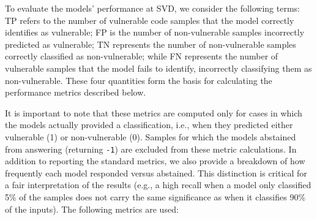 \documentclass[lettersize,journal]{IEEEtran}
\begin{document}
To evaluate the models' performance at \gls{SVD}, we consider the following terms: \gls{TP} refers to the number of vulnerable code samples that the model correctly identifies as vulnerable; \gls{FP} is the number of non-vulnerable samples incorrectly predicted as vulnerable; \gls{TN} represents the number of non-vulnerable samples correctly classified as non-vulnerable; while \gls{FN} represents the number of vulnerable samples that the model fails to identify, incorrectly classifying them as non-vulnerable. These four quantities form the basis for calculating the performance metrics described below.

It is important to note that these metrics are computed only for cases in which the models actually provided a classification, i.e., when they predicted either vulnerable (1) or non-vulnerable (0). Samples for which the models abstained from answering (returning \texttt{-1}) are excluded from these metric calculations. In addition to reporting the standard metrics, we also provide a breakdown of how frequently each model responded versus abstained. This distinction is critical for a fair interpretation of the results (e.g., a high recall when a model only classified 5\% of the samples does not carry the same significance as when it classifies 90\% of the inputs). The following metrics are used:
\end{document}
